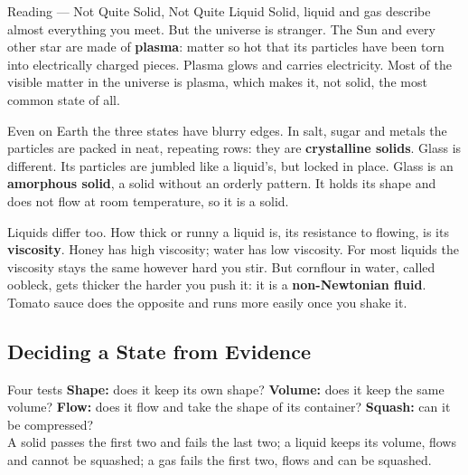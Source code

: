 \begin{readingbox}{Reading --- Not Quite Solid, Not Quite Liquid}
Solid, liquid and gas describe almost everything you meet. But the universe is stranger. The Sun and every other star are made of \textbf{plasma}: matter so hot that its particles have been torn into electrically charged pieces. Plasma glows and carries electricity. Most of the visible matter in the universe is plasma, which makes it, not solid, the most common state of all.

Even on Earth the three states have blurry edges. In salt, sugar and metals the particles are packed in neat, repeating rows: they are \textbf{crystalline solids}. Glass is different. Its particles are jumbled like a liquid's, but locked in place. Glass is an \textbf{amorphous solid}, a solid without an orderly pattern. It holds its shape and does not flow at room temperature, so it is a solid.

Liquids differ too. How thick or runny a liquid is, its resistance to flowing, is its \textbf{viscosity}. Honey has high viscosity; water has low viscosity. For most liquids the viscosity stays the same however hard you stir. But cornflour in water, called oobleck, gets thicker the harder you push it: it is a \textbf{non-Newtonian fluid}. Tomato sauce does the opposite and runs more easily once you shake it.
\end{readingbox}

\rcreset
{}

\label{theory:1}

\subsection{Deciding a State from Evidence}\label{sub:a1.1}

\begin{skillbox}{Four tests}
\textbf{Shape:} does it keep its own shape? \quad \textbf{Volume:} does it keep the same volume? \quad \textbf{Flow:} does it flow and take the shape of its container? \quad \textbf{Squash:} can it be compressed?\\
A solid passes the first two and fails the last two; a liquid keeps its volume, flows and cannot be squashed; a gas fails the first two, flows and can be squashed.
\end{skillbox}

